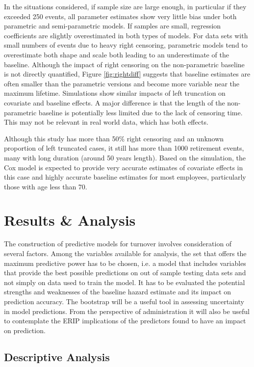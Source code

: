 In the situations considered, if sample size are large enough, in particular if they exceeded 250 events, all parameter estimates show very little bias under both parametric and semi-parametric models.  If samples are small, regression coefficients are slightly overestimated in both types of models. For data sets with small numbers of events due to heavy right censoring, parametric models tend to overestimate both shape and scale both leading to an underestimate of the baseline.  Although the impact of right censoring on the non-parametric baseline is not directly quantified, Figure \ref{fig:rightdiff} suggests that baseline estimates are often smaller than the parametric versions and become more variable near the maximum lifetime.  Simulations show similar impacts of left truncation on covariate and baseline effects.  A major difference is that the length of the non-parametric baseline is potentially less limited due to the lack of censoring time.  This may not be relevant in real world data, which has both effects.

Although this study has more than 50\% right censoring and an unknown proportion of left truncated cases, it still has more than 1000 retirement events, many with long duration (around 50 years length). Based on the simulation, the Cox model is expected to provide very accurate estimates of covariate effects in this case and highly accurate baseline estimates for most employees, particularly those with age less than 70.

\section{Results \& Analysis} \label{application}
The construction of predictive models for turnover involves consideration of several factors. Among the variables available for analysis,  the set that offers the maximum predictive power has to be chosen, i.e. a model that includes variables that provide the best possible predictions on out of sample testing data sets and not simply on data used to train the model. It has to be evaluated the potential strengths and weaknesses of the baseline hazard estimate and its impact on prediction accuracy.  The bootstrap will be a useful tool in assessing uncertainty in model predictions. From the perspective of administration it will also be useful to contemplate the ERIP implications of the predictors found to have an impact on prediction.

\subsection{Descriptive Analysis}

